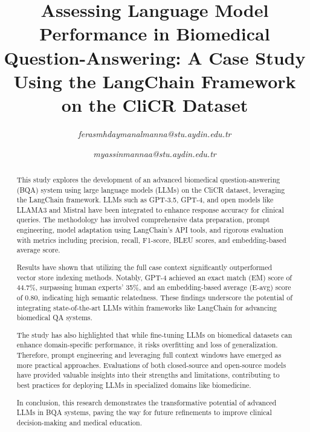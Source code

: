 \documentclass[onecolumn, conference]{IEEEtran}
\begin{document}


\title{Assessing Language Model Performance in Biomedical Question-Answering: A Case Study Using the LangChain Framework on the CliCR Dataset}

\author{
  \textit{ferasmhdaymanalmanna@stu.aydin.edu.tr}
  \and
  \textit{myassinmannaa@stu.aydin.edu.tr}
}

\maketitle

\begin{abstract}
  This study explores the development of an advanced biomedical question-answering (BQA) system using large language models (LLMs) on the CliCR dataset, leveraging the LangChain framework. LLMs such as GPT-3.5, GPT-4, and open models like LLAMA3 and Mistral have been integrated to enhance response accuracy for clinical queries. The methodology has involved comprehensive data preparation, prompt engineering, model adaptation using LangChain's API tools, and rigorous evaluation with metrics including precision, recall, F1-score, BLEU scores, and embedding-based average score.

  Results have shown that utilizing the full case context significantly outperformed vector store indexing methods. Notably, GPT-4 achieved an exact match (EM) score of 44.7\%, surpassing human experts' 35\%, and an embedding-based average (E-avg) score of 0.80, indicating high semantic relatedness. These findings underscore the potential of integrating state-of-the-art LLMs within frameworks like LangChain for advancing biomedical QA systems.

  The study has also highlighted that while fine-tuning LLMs on biomedical datasets can enhance domain-specific performance, it risks overfitting and loss of generalization. Therefore, prompt engineering and leveraging full context windows have emerged as more practical approaches. Evaluations of both closed-source and open-source models have provided valuable insights into their strengths and limitations, contributing to best practices for deploying LLMs in specialized domains like biomedicine.

  In conclusion, this research demonstrates the transformative potential of advanced LLMs in BQA systems, paving the way for future refinements to improve clinical decision-making and medical education.
\end{abstract}
\end{document}
